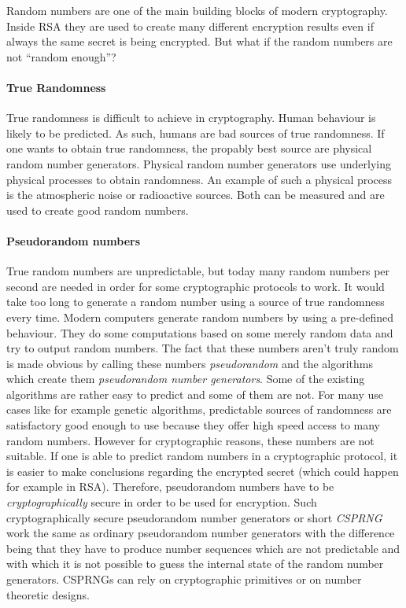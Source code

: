 Random numbers are one of the main building blocks of modern cryptography.
Inside RSA they are used to create many different encryption results even
if always the same secret is being encrypted. But what if the random numbers
are not ``random enough''?

\paragraph{True Randomness}
True randomness is difficult to achieve in cryptography. Human behaviour
is likely to be predicted. As such, humans are bad sources of true randomness.
If one wants to obtain true randomness, the propably best source are physical
random number generators. Physical random number generators use underlying
physical processes to obtain randomness. An example of such a physical process
is the atmospheric noise or radioactive sources. Both can be measured and
are used to create good random numbers.

\paragraph{Pseudorandom numbers}
True random numbers are unpredictable, but today many random numbers per
second are needed in order for some cryptographic protocols to work. It would
take too long to generate a random number using a source of true randomness
every time. Modern computers generate random numbers by using a pre-defined behaviour.
They do some computations based on some merely random data and try to output
random numbers. The fact that these numbers aren't truly random is made obvious
by calling these numbers \textit{pseudorandom} and the algorithms which create
them \textit{pseudorandom number generators}. Some of the existing algorithms
are rather easy to predict and some of them are not. For many use cases like
for example genetic algorithms, predictable sources of randomness are satisfactory
good enough to use because they offer high speed access to many random numbers.
However for cryptographic reasons, these numbers are not suitable. If one is
able to predict random numbers in a cryptographic protocol, it is easier to
make conclusions regarding the encrypted secret (which could happen for example
in RSA). Therefore, pseudorandom numbers have to be \textit{cryptographically}
secure in order to be used for encryption. Such cryptographically secure pseudorandom
number generators or short \textit{CSPRNG} work the same as ordinary pseudorandom
number generators with the difference being that they have to produce number sequences
which are not predictable and with which it is not possible to guess the internal
state of the random number generators. CSPRNGs can rely on cryptographic primitives
or on number theoretic designs.

